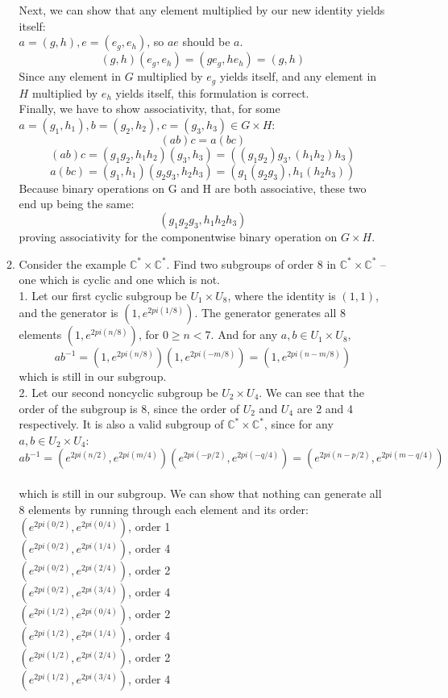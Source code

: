 \begin{enumerate}
\begin{enumerate}
Next, we can show that any element multiplied by our new identity yields itself:\\
$a = (g,h), e = (e_g,e_h)$, so $ae$ should be $a$.
$$(g,h)(e_g,e_h) = (ge_g,he_h) = (g,h)$$
Since any element in $G$ multiplied by $e_g$ yields itself, and any element in $H$ multiplied by $e_h$ yields itself, this formulation is correct.\\

Finally, we have to show associativity, that, for some $a=(g_1,h_1),b=(g_2,h_2),c=(g_3,h_3) \in G \times H$:
$$(ab)c = a(bc)$$
$$(ab)c = (g_1g_2,h_1h_2)(g_3,h_3) = ((g_1g_2)g_3, (h_1h_2)h_3)$$
$$a(bc) = (g_1,h_1)(g_2g_3,h_2h_3) = (g_1(g_2g_3),h_1(h_2h_3))$$
Because binary operations on G and H are both associative, these two end up being the same:
$$(g_1g_2g_3,h_1h_2h_3)$$
proving associativity for the componentwise binary operation on $G \times H$.\\

\item
 Consider the example $\mathds{C}^{*} \times \mathds{C}^{*}$. Find two subgroups of order 8 in $\mathds{C}^{*} \times \mathds{C}^{*}$ -- one which is cyclic and one which is not.\\

 1. Let our first cyclic subgroup be $U_1 \times U_8$, where the identity is $(1, 1)$, and the generator is $(1,e^{2pi(1/8)})$. The generator generates all 8 elements $(1, e^{2pi(n/8)})$, for $0 \geq n < 7$. And for any $a,b \in U_1 \times U_8$, 
$$ab^{-1} = (1, e^{2pi(n/8)})(1, e^{2pi(-m/8)}) = (1, e^{2pi(n-m/8)})$$
which is still in our subgroup.\\

 2. Let our second noncyclic subgroup be $U_2 \times U_4$. We can see that the order of the subgroup is 8, since the order of $U_2$ and $U_4$ are 2 and 4 respectively. It is also a valid subgroup of $\mathds{C}^{*} \times \mathds{C}^{*}$, since for any $a,b \in U_2 \times U_4$:
$$
ab^{-1} = (e^{2pi(n/2)}, e^{2pi(m/4)})(e^{2pi(-p/2)}, e^{2pi(-q/4)}) = (e^{2pi(n-p/2)}, e^{2pi(m-q/4)})
$$\\
which is still in our subgroup. We can show that nothing can generate all 8 elements by running through each element and its order:
$(e^{2pi(0/2)}, e^{2pi(0/4)})$, order 1\\
$(e^{2pi(0/2)}, e^{2pi(1/4)})$, order 4\\
$(e^{2pi(0/2)}, e^{2pi(2/4)})$, order 2\\
$(e^{2pi(0/2)}, e^{2pi(3/4)})$, order 4\\
$(e^{2pi(1/2)}, e^{2pi(0/4)})$, order 2\\
$(e^{2pi(1/2)}, e^{2pi(1/4)})$, order 4\\
$(e^{2pi(1/2)}, e^{2pi(2/4)})$, order 2\\
$(e^{2pi(1/2)}, e^{2pi(3/4)})$, order 4\\


\end{enumerate}
\end{enumerate}
